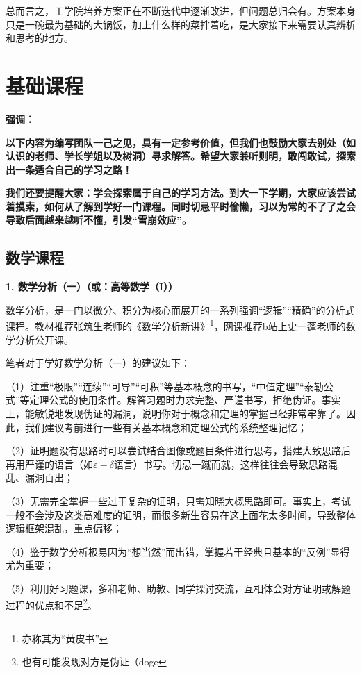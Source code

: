 \documentclass[11pt,oneside]{book}
\begin{document}
总而言之，工学院培养方案正在不断迭代中逐渐改进，但问题总归会有。方案本身只是一碗最为基础的大锅饭，加上什么样的菜拌着吃，是大家接下来需要认真辨析和思考的地方。


\section{基础课程}
\textbf{强调：}

\textbf{以下内容为编写团队一己之见，具有一定参考价值，但我们也鼓励大家去别处（如认识的老师、学长学姐以及树洞）寻求解答。希望大家兼听则明，敢闯敢试，探索出一条适合自己的学习之路！}

\textbf{我们还要提醒大家：学会探索属于自己的学习方法。到大一下学期，大家应该尝试着摸索，如何从了解到学好一门课程。同时切忌平时偷懒，习以为常的不了了之会导致后面越来越听不懂，引发“雪崩效应”。}


\subsection{数学课程}
\textbf{1. 数学分析（一）（或：高等数学（I））}

数学分析，是一门以微分、积分为核心而展开的一系列强调“逻辑”“精确”的分析式课程。教材推荐张筑生老师的《数学分析新讲》\footnote{亦称其为“黄皮书”}，网课推荐b站上史一蓬老师的数学分析公开课。

\vspace{20pt}

笔者对于学好数学分析（一）的建议如下：

（1）注重“极限”“连续”“可导”“可积”等基本概念的书写，“中值定理”“泰勒公式”等定理公式的使用条件。解答习题时力求完整、严谨书写，拒绝伪证。事实上，能敏锐地发现伪证的漏洞，说明你对于概念和定理的掌握已经非常牢靠了。因此，我们建议考前进行一些有关基本概念和定理公式的系统整理记忆；

（2）证明题没有思路时可以尝试结合图像或题目条件进行思考，搭建大致思路后再用严谨的语言（如$\varepsilon-\delta$语言）书写。切忌一蹴而就，这样往往会导致思路混乱、漏洞百出；

（3）无需完全掌握一些过于复杂的证明，只需知晓大概思路即可。事实上，考试一般不会涉及这类高难度的证明，而很多新生容易在这上面花太多时间，导致整体逻辑框架混乱，重点偏移；

（4）鉴于数学分析极易因为“想当然”而出错，掌握若干经典且基本的“反例”显得尤为重要；

（5）利用好习题课，多和老师、助教、同学探讨交流，互相体会对方证明或解题过程的优点和不足\footnote{也有可能发现对方是伪证（doge}。

\vspace{20pt}
\end{document}

